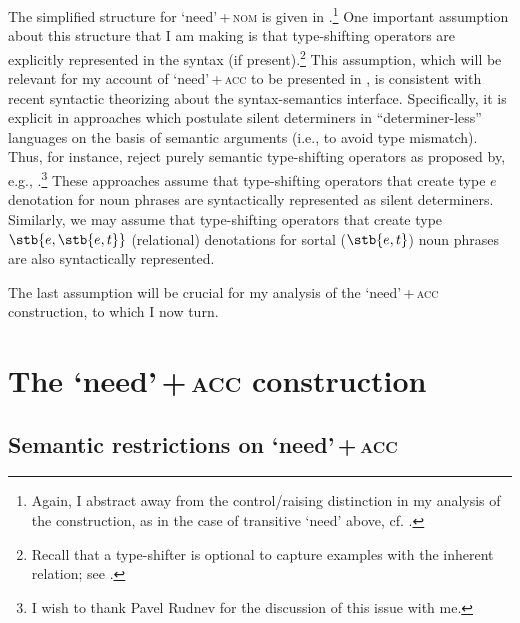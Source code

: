 \documentclass[output=paper]{langscibook}
\begin{document}
The simplified structure for `need'\,+\,\textsc{nom} is given in .\footnote{Again, I abstract away from the control/raising distinction in my analysis of the construction, as in the case of transitive `need' above, cf. .} One important assumption about this structure that I am making is that type-shifting operators are explicitly represented in the syntax (if present).\footnote{Recall that a type-shifter is optional to capture examples with the inherent relation; see .} This assumption, which will be relevant for my account of `need'\,+\,\textsc{acc} to be presented in , is consistent with recent syntactic theorizing about the syntax-semantics interface. Specifically, it is explicit in approaches which postulate silent determiners in ``determiner-less'' languages on the basis of semantic arguments (i.e., to avoid type mismatch). Thus, for instance, \citet{Ramchand.Svenonius2008} reject purely semantic type-shifting operators as proposed by, e.g., \citet{Chierchia1998}.\footnote{I wish to thank Pavel Rudnev for the discussion of this issue with me.} These approaches assume that type-shifting operators that create type $e$ denotation for noun phrases are syntactically represented as silent determiners. Similarly, we may assume that type-shifting operators that create type $\stb{e,\stb{e,t}}$ (relational) denotations for sortal ($\stb{e,t}$) noun phrases are also syntactically represented.


The last assumption will be crucial for my analysis of the `need'\,+\,\textsc{acc} construction, to which I now turn.

\section{The `need'\,+\,\textsc{acc} construction}\label{section-acc}

\subsection{Semantic restrictions on `need'\,+\,\textsc{acc}}\label{section-acc-restrictions}
\end{document}
